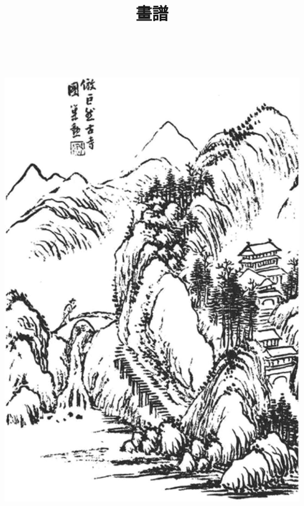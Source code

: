 \documentclass{zhvt-classic}
\title{畫譜}
\begin{document}
~\vspace{5pt}\par
\hfil \includegraphics[angle=90]{paint01}
\clearpage
~\vspace{5pt}\par
\end{document}
